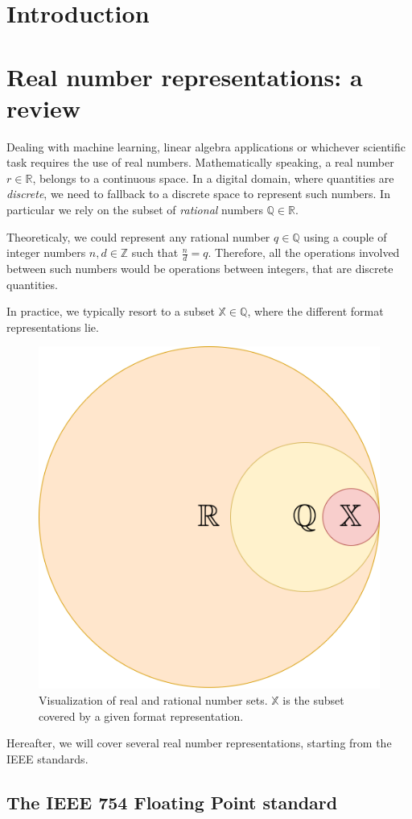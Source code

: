\chapter{Introduction}



\chapter{Real number representations: a review}

Dealing with machine learning, linear algebra applications or whichever scientific task requires the use of real numbers. Mathematically speaking, a real number $r \in \mathbb{R}$, belongs to a continuous space. In a digital domain, where quantities are \textit{discrete}, we need to fallback to a discrete space to represent such numbers.  In particular we rely on the subset of \textit{rational} numbers $\mathbb{Q} \in \mathbb{R}$.

Theoreticaly, we could represent any rational number $q \in \mathbb{Q}$ using a couple of integer numbers $n,d \in \mathbb{Z}$ such that $\frac{n}{d} = q$. Therefore, all the operations involved between such numbers would be operations between integers, that are discrete quantities.

In practice, we typically resort to a subset $\mathbb{X} \in \mathbb{Q}$, where the different format representations lie.

\begin{figure}
    \centering
    \includegraphics[width=0.3\linewidth]{img/real_sets.png}
    \caption{Visualization of real and rational number sets. $\mathbb{X}$ is the subset covered by a given format representation.}
    \label{fig:my_label}
\end{figure}

Hereafter, we will cover several real number representations, starting from the IEEE standards.


\section{The IEEE 754 Floating Point standard}

